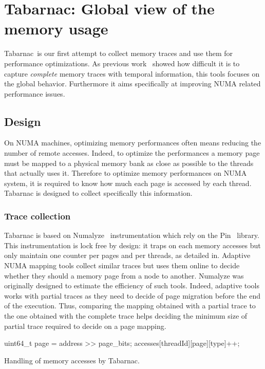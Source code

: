 \section{Tabarnac: Global view of the memory usage}
\label{sec:Tabarnac}

\acrfull{Tabarnac} is our first attempt to collect memory traces and use them for performance optimizations.
As previous work~\cite{Beniamine13Cartographier} showed how difficult it is to capture \emph{complete} memory traces with temporal information, this tools focuses on the global behavior.
Furthermore it aims specifically at improving \gls{NUMA} related performance issues.

\subsection{Design}

On \gls{NUMA} machines, optimizing memory performances often means reducing the number of remote accesses.
Indeed, to optimize the performances a memory page must be mapped to a physical memory bank as close as possible to the threads that actually uses it.
Therefore to optimize memory performances on \gls{NUMA} system, it is required to know how much each page is accessed by each thread.
\gls{Tabarnac} is designed to collect specifically this information.

\subsubsection{Trace collection}

\gls{Tabarnac} is based on \gls{Numalyze}~\cite{Diener15Characterizing} instrumentation which rely on the \gls{Pin}~\cite{Luk05Pin} library.
This instrumentation is lock free by design: it traps on each memory accesses but only maintain one counter per pages and per threads, as detailed in.
Adaptive \gls{NUMA} mapping tools collect similar traces but uses them online to decide whether they should a memory page from a node to another.
\gls{Numalyze} was originally designed to estimate the efficiency of such tools.
Indeed, adaptive tools works with partial traces as they need to decide of page migration before the end of the execution.
Thus, comparing the mapping obtained with a partial trace to the one obtained with the complete trace helps deciding the minimum size of partial trace required to decide on a page mapping.

\begin{algorithm}[htb]
    \begin{algorithmic}
            \State uint64\_t page = address >> page\_bits;
            \State accesses[threadId][page][type]++;
        \EndFunction
    \end{algorithmic}
    \caption{Handling of memory accesses by Tabarnac.}
    \label{alg:Tabarnac}
\end{algorithm}


